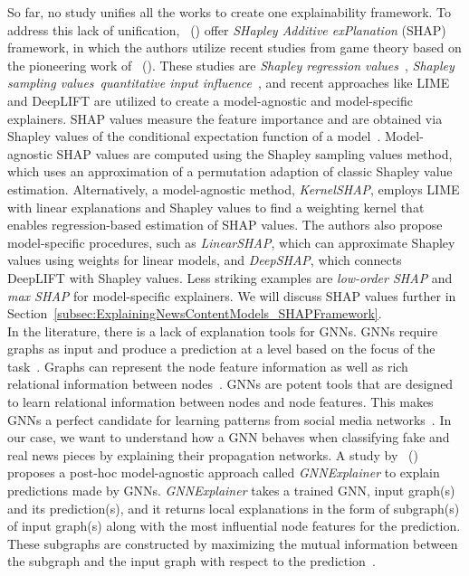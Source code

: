 So far, no study unifies all the works to create one explainability framework. To address this lack of unification,~\citeauthor{AUnifiedApproach_Lundberg} (\citeyear{AUnifiedApproach_Lundberg}) offer \emph{SHapley Additive exPlanation} (SHAP) framework, in which the authors utilize recent studies from game theory based on the pioneering work of~\citeauthor{GameTheory_Shapley} (\citeyear{GameTheory_Shapley}). These studies are \emph{Shapley regression values}~\parencite{AnalysisOfRegressionInGameTheory_Lipovetsky}, \emph{Shapley sampling values}~\parencite{ExplainingPredictionModels_Strumbelj}\emph{quantitative input influence}~\parencite{AlgorithmicTransparencyViaQuantitativeInputInfluence_Datta}, and recent approaches like LIME and DeepLIFT are utilized to create a model-agnostic and model-specific explainers. SHAP values measure the feature importance and are obtained via Shapley values of the conditional expectation function of a model~\parencite{AUnifiedApproach_Lundberg}. Model-agnostic SHAP values are computed using the Shapley sampling values method, which uses an approximation of a permutation adaption of classic Shapley value estimation. Alternatively, a model-agnostic method, \emph{KernelSHAP}, employs LIME with linear explanations and Shapley values to find a weighting kernel that enables regression-based estimation of SHAP values. The authors also propose model-specific procedures, such as \emph{LinearSHAP}, which can approximate Shapley values using weights for linear models, and \emph{DeepSHAP}, which connects DeepLIFT with Shapley values. Less striking examples are \emph{low-order SHAP} and \emph{max SHAP} for model-specific explainers. We will discuss SHAP values further in Section~\ref{subsec:ExplainingNewsContentModels_SHAPFramework}.\\
In the literature, there is a lack of explanation tools for GNNs. GNNs require graphs as input and produce a prediction at a level based on the focus of the task~\parencite{DeepLearningOnGraphs_Zhang}. Graphs can represent the node feature information as well as rich relational information between nodes~\parencite{DeepLearningOnGraphs_Zhang, GNNsAReview_Zhou}. GNNs are potent tools that are designed to learn relational information between nodes and node features. This makes GNNs a perfect candidate for learning patterns from social media networks~\parencite{BeyondSigmoids_Zang}. In our case, we want to understand how a GNN behaves when classifying fake and real news pieces by explaining their propagation networks. A study by~\citeauthor{GNNExplainer_Ying} (\citeyear{GNNExplainer_Ying}) proposes a post-hoc model-agnostic approach called \emph{GNNExplainer} to explain predictions made by GNNs. \emph{GNNExplainer} takes a trained GNN, input graph(s) and its prediction(s), and it returns local explanations in the form of subgraph(s) of input graph(s) along with the most influential node features for the prediction. These subgraphs are constructed by maximizing the mutual information between the subgraph and the input graph with respect to the prediction~\parencite{GNNExplainer_Ying}.\\
